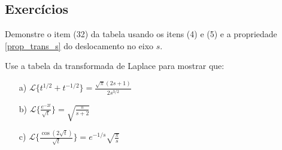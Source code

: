 \subsection*{Exercícios}
\begin{exer}
Demonstre o item (32) da tabela usando os itens (4) e (5) e a propriedade \ref{prop_trans_s} do deslocamento no eixo $s$. 
\end{exer}
\begin{exer}
Use a tabela da transformada de Laplace para mostrar que:
\begin{itemize}
  \item[a)] $\displaystyle \mathcal{L} \big\{ t^{1/2}+ t^{-1/2} \big\} = \frac{\sqrt{\pi}(2s+1)}{2s^{3/2}}$
  \item[b)] $\displaystyle \mathcal{L} \bigg\{ \frac{e^{-2t}}{\sqrt{t}} \bigg\} = \sqrt{\frac{\pi}{s+2}}$
  \item[c)] $\displaystyle \mathcal{L} \bigg\{ \frac{\cos(2\sqrt{t}) }{\sqrt{t}} \bigg\} = e^{-1/s}\sqrt{\frac{\pi}{s}}$
\end{itemize}
\end{exer}

